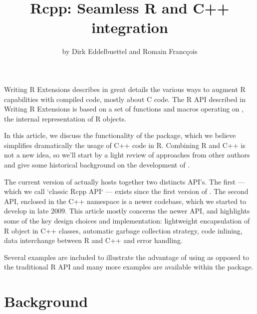 
\title{Rcpp: Seamless R and C++ integration}
\author{by Dirk Eddelbuettel and Romain Franc\c{c}ois}

\maketitle


Writing R Extensions \citep{R:exts} describes in great details
the various ways to augment R capabilities with compiled code, 
mostly about C code. The R API described in 
Writing R Extensions is based on a set of functions and macros
operating on , the internal representation of R objects.

In this article, we discuss the functionality of the 
package, which we believe simplifies dramatically the usage of C++ code
in R. Combining R and C++ is not a new idea, so we'll start by
a light review of approaches from other authors and give some historical
background on the development of .

The current version of  actually hosts together two distincts
API's. The first --- which we call `classic Rcpp API` --- exists since 
the first version of . The second API, enclosed in the 
 C++ namespace is a newer codebase, which we started to develop
in late 2009. This article mostly concerns the newer API, and 
highlights some of the key design choices and implementation: 
lightweight encapsulation of R object in C++ classes, automatic
garbage collection strategy, code inlining, data interchange between 
R and C++ and error handling. 

Several examples are included to 
illustrate the advantage of using  as opposed to 
the traditional R API and many more examples are available within 
the package. 

\section{Background}

